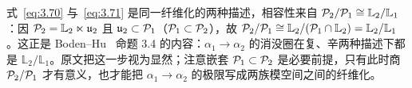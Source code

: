 \begin{yizhu}[易错点]式~\eqref{eq:3.70} 与~\eqref{eq:3.71} 是同一纤维化的两种描述，相容性来自 $\mathcal{P}_2/\mathcal{P}_1\cong\mathbb{L}_2/\mathbb{L}_1$：因 $\mathcal{P}_2=\mathbb{L}_2\ltimes\mathfrak u_2$ 且 $\mathfrak u_2\subset\mathcal{P}_1$（$\mathcal{P}_1\subset\mathcal{P}_2$），故 $\mathcal{P}_2/\mathcal{P}_1\cong\mathbb{L}_2/(\mathcal{P}_1\cap\mathbb{L}_2)=\mathbb{L}_2/\mathbb{L}_1$。这正是 Boden--Hu~\cite{ref60} 命题 3.4 的内容：$\alpha_1\to\alpha_2$ 的消没圈在复、辛两种描述下都是 $\mathbb{L}_2/\mathbb{L}_1$。原文把这一步视为显然；注意嵌套 $\mathcal{P}_1\subset\mathcal{P}_2$ 是必要前提，只有此时商 $\mathcal{P}_2/\mathcal{P}_1$ 才有意义，也才能把 $\alpha_1\to\alpha_2$ 的极限写成两族模空间之间的纤维化。\end{yizhu}
